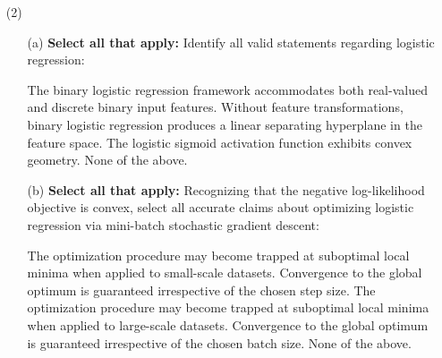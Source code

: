 \documentclass[11pt,addpoints,answers]{exam}
\newcommand{\sall}{\textbf{Select all that apply: }}
\begin{document}
\begin{enumerate}
\begin{enumerate}[label=\alph*), itemsep=10pt]
			\begin{your_solution}[title=Work, height=6cm]
			\end{your_solution}
			
			
		\end{enumerate}
		
		\item[(2)] 
		
		\begin{enumerate}[label=\alph*), itemsep=10pt]
			\item[(a)] \sall Identify all valid statements regarding logistic regression:
			
			{%
				\checkboxchar{$\Box$} \checkedchar{$\blacksquare$}
				\begin{checkboxes}
					\choice The binary logistic regression framework accommodates both real-valued and discrete binary input features.
					\choice Without feature transformations, binary logistic regression produces a linear separating hyperplane in the feature space.
					\choice The logistic sigmoid activation function exhibits convex geometry.
					\choice None of the above.
				\end{checkboxes}
			}
			
			
			
			
			\item[(b)] \sall Recognizing that the negative log-likelihood objective is convex, select all accurate claims about optimizing logistic regression via mini-batch stochastic gradient descent:
			
			{%
				\checkboxchar{$\Box$} \checkedchar{$\blacksquare$}
				\begin{checkboxes}
					\choice The optimization procedure may become trapped at suboptimal local minima when applied to small-scale datasets.
					\choice Convergence to the global optimum is guaranteed irrespective of the chosen step size.
					\choice The optimization procedure may become trapped at suboptimal local minima when applied to large-scale datasets.
					\choice Convergence to the global optimum is guaranteed irrespective of the chosen batch size.
					\choice None of the above.
				\end{checkboxes}
			}
			
			
			
			\vspace*{1.2cm}
			

\end{enumerate}
\end{enumerate}
\end{document}
